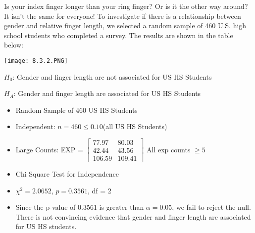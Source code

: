 \documentclass[../stats.tex]{subfiles}
\begin{document}
\begin{example}
    Is your index finger longer than your ring finger? Or is it the other way around? It isn't the same for everyone! To investigate if there is a relationship between gender and relative finger length, we selected a random sample of 460 U.S. high school students who completed a survey. The results are shown in the table below:
    
    \begin{center}
        \texttt{[image: 8.3.2.PNG]}
    \end{center}

    $H_0$: Gender and finger length are not associated for US HS Students 

    $H_A$: Gender and finger length are associated for US HS Students 

    \begin{itemize}
        \item Random Sample of 460 US HS Students 
        \item Independent: $n=460\leq 0.10$(all US HS Students)
        \item Large Counts: EXP = $\begin{bmatrix}
            77.97 & 80.03 \\
            42.44 & 43.56 \\
            106.59 & 109.41
        \end{bmatrix}$ All exp counts $\geq 5$
        \item Chi Square Test for Independence
        \item $\chi^2=2.0652$, $p=0.3561$, df = 2
        \item Since the p-value of 0.3561 is greater than $\alpha = 0.05$, we fail to reject the null. There is not convincing evidence that gender and finger length are associated for US HS students.
    \end{itemize}
\end{example}
\end{document}
